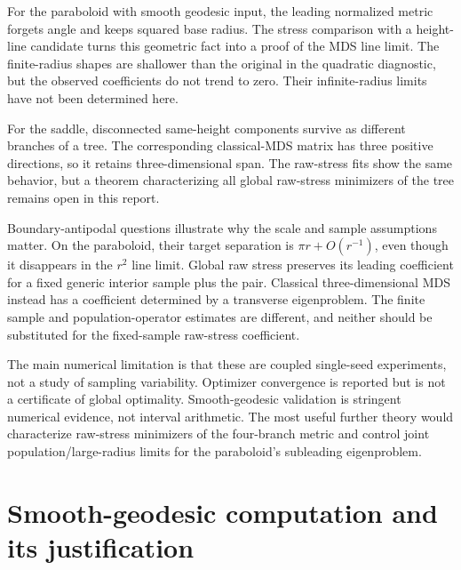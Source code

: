 \documentclass[11pt]{article}
\theoremstyle{remark}\newtheorem{remark}[proposition]{Remark}
\begin{document}
For the paraboloid with smooth geodesic input, the leading normalized metric
forgets angle and keeps squared base radius. The stress comparison with a
height-line candidate turns this geometric fact into a proof of the MDS line
limit. The finite-radius shapes are shallower than the original in the
quadratic diagnostic, but the observed coefficients do not trend to zero.
Their infinite-radius limits have not been determined here.

For the saddle, disconnected same-height components survive as different
branches of a tree. The corresponding classical-MDS matrix has three positive
directions, so it retains three-dimensional span. The raw-stress fits show the
same behavior, but a theorem characterizing all global raw-stress minimizers
of the tree remains open in this report.

Boundary-antipodal questions illustrate why the scale and sample assumptions
matter. On the paraboloid, their target separation is $\pi r+O(r^{-1})$, even
though it disappears in the $r^2$ line limit. Global raw stress preserves its
leading coefficient for a fixed generic interior sample plus the pair.
Classical three-dimensional MDS instead has a coefficient determined by a
transverse eigenproblem. The finite sample and population-operator estimates
are different, and neither should be substituted for the fixed-sample raw-stress
coefficient.

The main numerical limitation is that these are coupled single-seed
experiments, not a study of sampling variability. Optimizer convergence is
reported but is not a certificate of global optimality. Smooth-geodesic
validation is stringent numerical evidence, not interval arithmetic. The
most useful further theory would characterize raw-stress minimizers of the
four-branch metric and control joint population/large-radius limits for the
paraboloid's subleading eigenproblem.

\appendix
\section{Smooth-geodesic computation and its justification}\label{app:geodesics}
\end{document}
